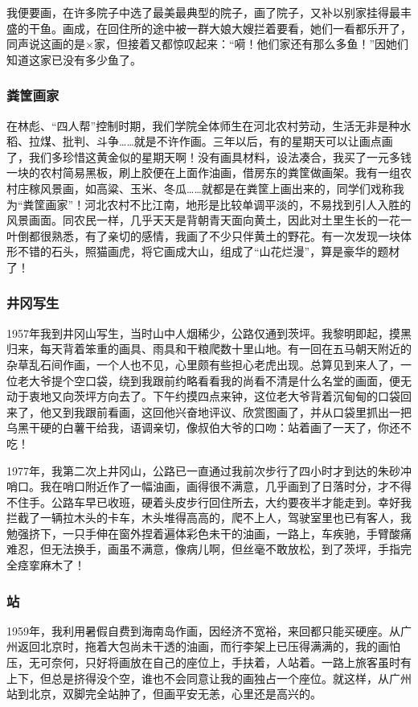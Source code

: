 \documentclass{article}
\begin{document}
我便要画，在许多院子中选了最美最典型的院子，画了院子，又补以别家挂得最丰盛的干鱼。画成，在回住所的途中被一群大娘大嫂拦着要看，她们一看都乐开了，同声说这画的是×家，但接着又都惊叹起来：“嗬！他们家还有那么多鱼！”因她们知道这家已没有多少鱼了。
\subsubsection{粪筐画家}
在林彪、“四人帮”控制时期，我们学院全体师生在河北农村劳动，生活无非是种水稻、拉煤、批判、斗争……就是不许作画。三年以后，有的星期天可以让画点画了，我们多珍惜这黄金似的星期天啊！没有画具材料，设法凑合，我买了一元多钱一块的农村简易黑板，刷上胶便在上面作油画，借房东的粪筐做画架。我有一组农村庄稼风景画，如高粱、玉米、冬瓜……就都是在粪筐上画出来的，同学们戏称我为“粪筐画家”！河北农村不比江南，地形是比较单调平淡的，不易找到引人入胜的风景画面。同农民一样，几乎天天是背朝青天面向黄土，因此对土里生长的一花一叶倒都很熟悉，有了亲切的感情，我画了不少只伴黄土的野花。有一次发现一块体形不错的石头，照猫画虎，将它画成大山，组成了“山花烂漫”，算是豪华的题材了！
\subsubsection{井冈写生}
1957年我到井冈山写生，当时山中人烟稀少，公路仅通到茨坪。我黎明即起，摸黑归来，每天背着笨重的画具、雨具和干粮爬数十里山地。有一回在五马朝天附近的杂草乱石间作画，一个人也不见，心里颇有些担心老虎出现。总算见到来人了，一位老大爷提个空口袋，绕到我跟前约略看看我的尚看不清是什么名堂的画面，便无动于衷地又向茨坪方向去了。下午约摸四点来钟，这位老大爷背着沉甸甸的口袋回来了，他又到我跟前看画，这回他兴奋地评议、欣赏图画了，并从口袋里抓出一把乌黑干硬的白薯干给我，语调亲切，像叔伯大爷的口吻：站着画了一天了，你还不吃！

1977年，我第二次上井冈山，公路已一直通过我前次步行了四小时才到达的朱砂冲哨口。我在哨口附近作了一幅油画，画得很不满意，几乎画到了日落时分，才不得不住手。公路车早已收班，硬着头皮步行回住所去，大约要夜半才能走到。幸好我拦截了一辆拉木头的卡车，木头堆得高高的，爬不上人，驾驶室里也已有客人，我勉强挤下，一只手伸在窗外捏着遍体彩色未干的油画，一路上，车疾驰，手臂酸痛难忍，但无法换手，画虽不满意，像病儿啊，但丝毫不敢放松，到了茨坪，手指完全痉挛麻木了！
\subsubsection{站}
1959年，我利用暑假自费到海南岛作画，因经济不宽裕，来回都只能买硬座。从广州返回北京时，拖着大包尚未干透的油画，而行李架上已压得满满的，我的画怕压，无可奈何，只好将画放在自己的座位上，手扶着，人站着。一路上旅客虽时有上下，但总是挤得没个空，谁也不会同意让我的画独占一个座位。就这样，从广州站到北京，双脚完全站肿了，但画平安无恙，心里还是高兴的。
\end{document}
